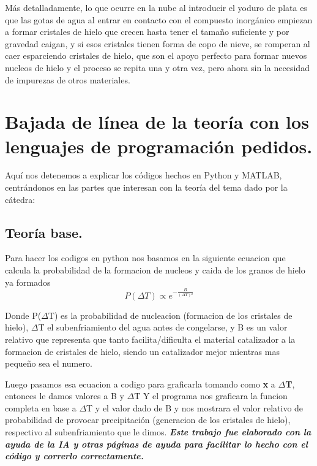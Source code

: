 \documentclass[12pt,a4paper]{article}
\begin{document}
Más detalladamente, lo que ocurre en la nube al introducir el yoduro de plata es que las gotas de agua al entrar en contacto con el compuesto inorgánico empiezan a formar cristales de hielo que crecen hasta tener el tamaño suficiente y por gravedad caigan, y si esos cristales tienen forma de copo de nieve, se romperan al caer esparciendo cristales de hielo, que son el apoyo perfecto para formar nuevos nucleos de hielo y el proceso se repita una y otra vez, pero ahora sin la necesidad de impurezas de otros materiales.

\section{Bajada de línea de la teoría con los lenguajes de programación pedidos.}
Aquí nos detenemos a explicar los códigos hechos en Python y MATLAB, centrándonos en las partes que interesan con la teoría del tema dado por la cátedra:
 
\subsection{Teoría base.}
Para hacer los codigos en python nos basamos en la siguiente ecuacion que calcula la probabilidad de la formacion de nucleos y caida de los granos de hielo ya formados
\begin{equation}
    P(\Delta T) \propto  e^{-\frac{B}{(\Delta T)²} }
\end{equation}

Donde P($\Delta$T) es la probabilidad de nucleacion (formacion de los cristales
de hielo), $\Delta$T el subenfriamiento del agua antes de congelarse, y B es un
valor relativo que representa que tanto facilita/dificulta el material
catalizador a la formacion de cristales de hielo, siendo un catalizador mejor
mientras mas pequeño sea el numero.

Luego pasamos esa ecuacion a codigo para graficarla tomando como {\bfseries x} a {\bfseries $\Delta$T}, entonces le damos valores a B y $\Delta$T Y el programa nos graficara la funcion completa en base a $\Delta$T y el valor dado de B y nos mostrara el valor relativo de probabilidad de provocar precipitación (generacion de los cristales de hielo), respectivo al subenfriamiento que le dimos.
\vfill
\textit{\textbf{Este trabajo fue elaborado con la ayuda de la IA y otras páginas de ayuda para facilitar lo hecho con el código y correrlo correctamente.}}
\end{document}
